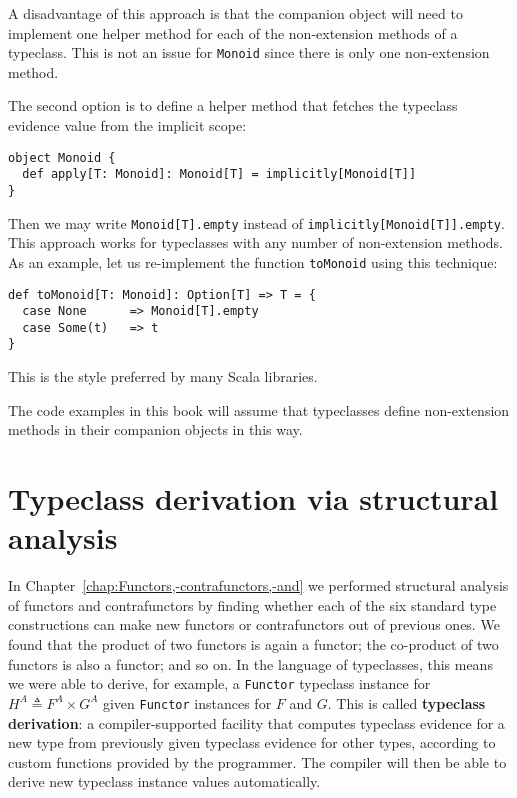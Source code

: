 A disadvantage of this approach is that the companion object will
need to implement one helper method for each of the non-extension
methods of a typeclass. This is not an issue for \lstinline!Monoid!
since there is only one non-extension method.

The second option is to define a helper method that fetches the typeclass
evidence value from the implicit scope:
\begin{lstlisting}
object Monoid {
  def apply[T: Monoid]: Monoid[T] = implicitly[Monoid[T]]
}
\end{lstlisting}
Then we may write \lstinline!Monoid[T].empty! instead of \lstinline!implicitly[Monoid[T]].empty!.
This approach works for typeclasses with any number of non-extension
methods. As an example, let us re-implement the function \lstinline!toMonoid!
using this technique:
\begin{lstlisting}
def toMonoid[T: Monoid]: Option[T] => T = {
  case None      => Monoid[T].empty
  case Some(t)   => t
}
\end{lstlisting}
This is the style preferred by many Scala libraries. 

The code examples in this book will assume that typeclasses define
non-extension methods in their companion objects in this way.

\section{Typeclass derivation via structural analysis}

In Chapter~\ref{chap:Functors,-contrafunctors,-and} we performed
structural analysis of functors and contrafunctors by finding whether
each of the six standard type constructions can make new functors
or contrafunctors out of previous ones. We found that the product
of two functors is again a functor; the co-product of two functors
is also a functor; and so on. In the language of typeclasses, this
means we were able to derive, for example, a \lstinline!Functor!
typeclass instance for $H^{A}\triangleq F^{A}\times G^{A}$ given
\lstinline!Functor! instances for $F$ and $G$. This is called
\textbf{typeclass derivation}: a compiler-supported facility that
computes typeclass evidence for a new type from previously given typeclass
evidence for other types, according to custom functions provided by
the programmer. The compiler will then be able to derive new typeclass
instance values automatically.

